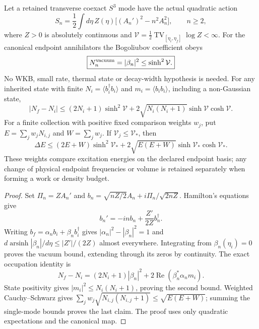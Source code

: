 \documentclass[12pt,a4paper]{article}
\begin{document}
\begin{theorem}
\label{p7:thm:v2216-gauge-total-variation}
Let a retained transverse coexact $S^3$ mode have the actual quadratic
action
\[
 S_n=\frac12\int d\eta\,Z(\eta)
       \bigl[(A_n')^2-n^2A_n^2\bigr],\qquad n\ge2,
\]
where $Z>0$ is absolutely continuous and
$\mathcal V=\tfrac12\operatorname{TV}_{[\eta_i,\eta_f]}\log Z<\infty$.
For the canonical endpoint annihilators the Bogoliubov coefficient obeys
\[
 \boxed{N_n^{\rm vacuum}=|\beta_n|^2\le\sinh^2\mathcal V.}
\]
No WKB, small rate, thermal state or decay-width hypothesis is needed.
For any inherited state with finite
$N_i=\langle b_i^\dagger b_i\rangle$ and
$m_i=\langle b_i b_i\rangle$, including a non-Gaussian state,
\[
 |N_f-N_i|\le(2N_i+1)\sinh^2\mathcal V
 +2\sqrt{N_i(N_i+1)}\sinh\mathcal V\cosh\mathcal V.
\]
For a finite collection with positive fixed comparison weights $w_j$,
put $E=\sum_jw_jN_{i,j}$ and $W=\sum_jw_j$.
If $\mathcal V_j\le\mathcal V_*$, then
\[
 \Delta E\le(2E+W)\sinh^2\mathcal V_*
 +2\sqrt{E(E+W)}\sinh\mathcal V_*\cosh\mathcal V_*.
\]
These weights compare excitation energies on the declared endpoint
basis; any change of physical endpoint frequencies or volume is retained
separately when forming a work or density budget.
\end{theorem}
\begin{proof}
Set $\Pi_n=ZA_n'$ and
$b_n=\sqrt{nZ/2}A_n+i\Pi_n/\sqrt{2nZ}$.  Hamilton's equations give
\[
 b_n'=-inb_n+\frac{Z'}{2Z}b_n^\dagger.
\]
Writing $b_f=\alpha_nb_i+\beta_nb_i^\dagger$ gives
$|\alpha_n|^2-|\beta_n|^2=1$ and
$d\operatorname{arsinh}|\beta_n|/d\eta\le|Z'|/(2Z)$
almost everywhere.  Integrating from $\beta_n(\eta_i)=0$ proves the
vacuum bound, extending through its zeros by continuity.  The exact
occupation identity is
\[
 N_f-N_i=(2N_i+1)|\beta_n|^2
              +2\operatorname{Re}(\beta_n^*\alpha_n m_i).
\]
State positivity gives $|m_i|^2\le N_i(N_i+1)$, proving the second
bound.  Weighted Cauchy--Schwarz gives
$\sum_jw_j\sqrt{N_{i,j}(N_{i,j}+1)}\le\sqrt{E(E+W)}$;
summing the single-mode bounds proves the last claim.  The proof uses
only quadratic expectations and the canonical map.
\end{proof}
\end{document}
